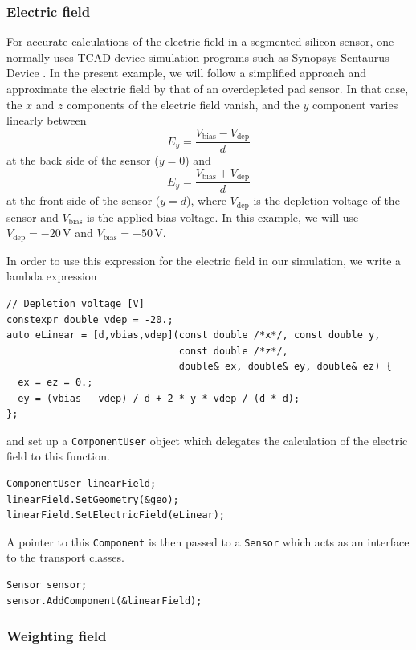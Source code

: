 \subsubsection{Electric field}
For accurate calculations of the electric field in a segmented silicon sensor, 
one normally uses TCAD device simulation programs such as 
Synopsys Sentaurus Device \cite{Synopsys}. 
In the present example, we will follow a simplified approach 
and approximate the electric field by that of an overdepleted pad sensor. 
In that case, the $x$ and $z$ components of the electric field vanish, 
and the $y$ component varies linearly between
\begin{equation*}
E_y = \frac{V_{\text{bias}} - V_{\text{dep}}}{d}
\end{equation*}
at the back side of the sensor ($y = 0$) and
\begin{equation*}
E_y = \frac{V_{\text{bias}} + V_{\text{dep}}}{d}
\end{equation*}
at the front side of the sensor ($y = d$), where 
$V_{\text{dep}}$ is the depletion voltage of the sensor and 
$V_{\text{bias}}$ is the applied bias voltage. 
In this example, we will use $V_{\text{dep}} = -20$\,V and 
$V_{\text{bias}} = -50$\,V.

In order to use this expression for the electric field in our simulation, 
we write a lambda expression
\begin{lstlisting}
// Depletion voltage [V]
constexpr double vdep = -20.;
auto eLinear = [d,vbias,vdep](const double /*x*/, const double y,
                              const double /*z*/,
                              double& ex, double& ey, double& ez) {
  ex = ez = 0.;
  ey = (vbias - vdep) / d + 2 * y * vdep / (d * d);
};
\end{lstlisting}
and set up a \texttt{ComponentUser} object 
which delegates the calculation of the electric field to this function.
\begin{lstlisting}
ComponentUser linearField;
linearField.SetGeometry(&geo);
linearField.SetElectricField(eLinear);
\end{lstlisting}
A pointer to this \texttt{Component} is then passed to a \texttt{Sensor}
which acts as an interface to the transport classes.
\begin{lstlisting}
Sensor sensor;
sensor.AddComponent(&linearField);
\end{lstlisting}

\subsubsection{Weighting field}

